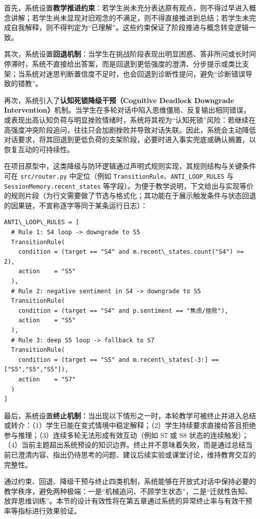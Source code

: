 首先，系统设置\textbf{教学推进约束}：若学生尚未充分表达原有观点，则不得过早进入概念讲解；若学生尚未显现对旧观念的不满足，则不得直接推进到总结；若学生未完成自我解释，则不得判定为“已理解”。这些约束保证了阶段推进与概念转变逻辑一致。

其次，系统设置\textbf{回退机制}：当学生在挑战阶段表现出明显困惑、答非所问或长时间停滞时，系统不直接给出答案，而是回退到更低强度的澄清、分步提示或类比支架；当系统对迷思判断置信度不足时，也会回退到诊断性提问，避免“诊断错误导致的错教”。

再次，系统引入了\textbf{认知死锁降级干预（Cognitive Deadlock Downgrade Intervention）}机制。当学生在多轮对话中陷入思维僵局、反复输出相同错误，或表现出高认知负荷与明显挫败情绪时，系统将其视为“认知死锁”风险：若继续在高强度冲突阶段追问，往往只会加剧挫败并导致对话失联。因此，系统会主动降低对话要求，将其回退到更低负荷的支架阶段，必要时进入事实兜底或确认搁置，以恢复互动的可持续性。

在项目原型中，这类降级与防环逻辑通过声明式规则实现，其规则结构与关键条件可在 \texttt{src/router.py} 中定位（例如 \texttt{TransitionRule}、\texttt{ANTI\_LOOP\_RULES} 与 \texttt{SessionMemory.recent\_states} 等字段）。为便于教学说明，下文给出与实现等价的规则片段（为行文需要做了节选与格式化；其功能在于展示触发条件与状态回退的因果链，不宣称逐字等同于某条运行日志）：

\begin{verbatim}
ANTI\_LOOP\_RULES = [
  # Rule 1: S4 loop -> downgrade to S5
  TransitionRule(
    condition = (target == "S4" and m.recent\_states.count("S4") >= 2),
    action    = "S5"
  ),
  # Rule 2: negative sentiment in S4 -> downgrade to S5
  TransitionRule(
    condition = (target == "S4" and p.sentiment == "焦虑/挫败"),
    action    = "S5"
  ),
  # Rule 3: deep S5 loop -> fallback to S7
  TransitionRule(
    condition = (target == "S5" and m.recent\_states[-3:] == ["S5","S5","S5"]),
    action    = "S7"
  )
]
\end{verbatim}

最后，系统设置\textbf{终止机制}：当出现以下情形之一时，本轮教学可被终止并进入总结或转介：（1）学生已能在变式情境中稳定解释；（2）学生持续要求直接给答且拒绝参与推理；（3）连续多轮无法形成有效互动（例如 S7 或 S8 状态的连续触发）；（4）当前主题超出系统预设的知识边界。终止并不意味着失败，而是通过总结当前已澄清内容、指出仍待思考的问题、建议后续实验或课堂讨论，维持教育交互的完整性。

通过约束、回退、降级干预与终止四类机制，系统能够在开放式对话中保持必要的教学秩序，避免两种极端：一是“机械追问、不顾学生状态”，二是“迁就性告知、放弃思维训练”。本节的设计有效性将在第五章通过系统的异常终止率与有效干预率等指标进行效果验证。

